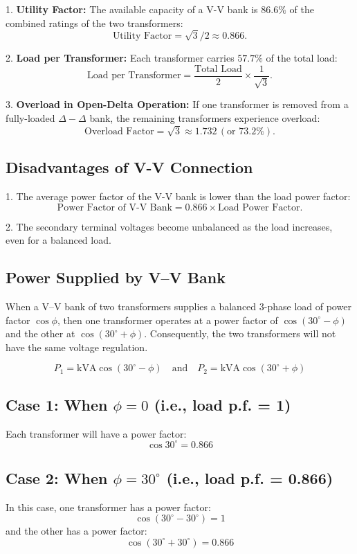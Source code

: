 \documentclass[a4paper,12pt]{article}
\begin{document}
	1. \textbf{Utility Factor:} The available capacity of a V-V bank is \( 86.6\% \) of the combined ratings of the two transformers:
	\[
	\text{Utility Factor} = \sqrt{3}/2 \approx 0.866.
	\]
	
	2. \textbf{Load per Transformer:} Each transformer carries \( 57.7\% \) of the total load:
	\[
	\text{Load per Transformer} = \frac{\text{Total Load}}{2} \times \frac{1}{\sqrt{3}}.
	\]
	
	3. \textbf{Overload in Open-Delta Operation:} If one transformer is removed from a fully-loaded $\Delta-\Delta$ bank, the remaining transformers experience overload:
	\[
	\text{Overload Factor} = \sqrt{3} \approx 1.732 \, (\text{or } 73.2\%).
	\]
	
	\subsection{Disadvantages of V-V Connection}
	
	1. The average power factor of the V-V bank is lower than the load power factor:
	\[
	\text{Power Factor of V-V Bank} = 0.866 \times \text{Load Power Factor}.
	\]
	
	2. The secondary terminal voltages become unbalanced as the load increases, even for a balanced load.
	
	\subsection{Power Supplied by V--V Bank}
	
	When a V--V bank of two transformers supplies a balanced 3-phase load of power factor $\cos \phi$, then one transformer operates at a power factor of $\cos (30^\circ - \phi)$ and the other at $\cos (30^\circ + \phi)$. Consequently, the two transformers will not have the same voltage regulation.
	
	\[
	P_1 = \text{kVA} \cos (30^\circ - \phi) \quad \text{and} \quad P_2 = \text{kVA} \cos (30^\circ + \phi)
	\]
	
	\subsection*{Case 1: When $\phi = 0$ (i.e., load p.f. = 1)}
	Each transformer will have a power factor:
	\[
	\cos 30^\circ = 0.866
	\]
	
	\subsection*{Case 2: When $\phi = 30^\circ$ (i.e., load p.f. = 0.866)}
	In this case, one transformer has a power factor:
	\[
	\cos (30^\circ - 30^\circ) = 1
	\]
	and the other has a power factor:
	\[
	\cos (30^\circ + 30^\circ) = 0.866
	\]
	
\end{document}
